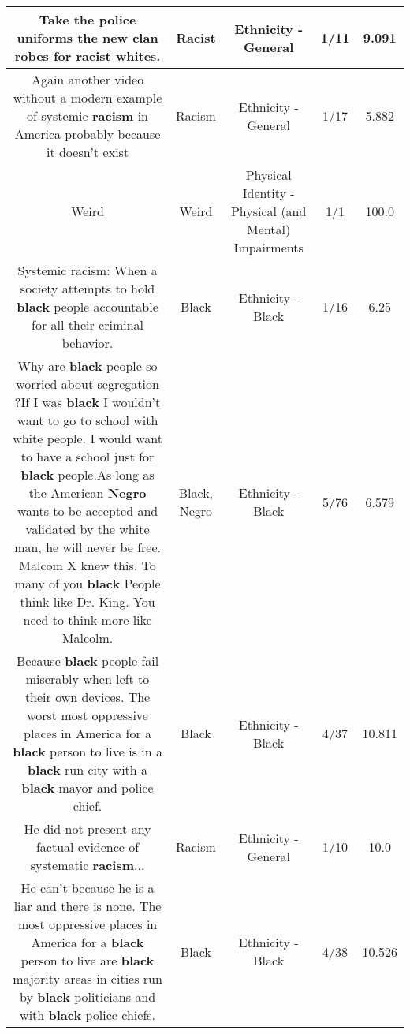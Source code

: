 \documentclass[11pt]{article}
\newlength\mylength
\begin{document}
\begin{center}
\begin{longtable}{|C{.65\mylength}|C{.30\mylength}|C{.12\mylength}|C{.12\mylength}|C{.12\mylength}|}
  \small Take the police uniforms the new clan robes for \textbf{racist} whites.\normalsize   & Racist & Ethnicity - General & 1/11 & 9.091 \\  \hline
  \small Again another video without a modern example of systemic \textbf{racism} in America probably because it doesn't exist\normalsize   & Racism & Ethnicity - General & 1/17 & 5.882 \\  \hline
  \small Weird\normalsize   & Weird & Physical Identity - Physical (and Mental) Impairments & 1/1 & 100.0 \\  \hline
  \small Systemic racism: When a society attempts to hold \textbf{black} people accountable for all their criminal behavior.\normalsize   & Black & Ethnicity - Black & 1/16 & 6.25 \\  \hline
  \small Why are \textbf{black} people so worried about segregation ?If I was \textbf{black} I wouldn't want to go to school with white people. I would want to have a school just for \textbf{black} people.As long as the American \textbf{Negro} wants to be accepted and validated by the white man, he will never be free. Malcom X knew this. To many of you \textbf{black} People think like Dr. King. You need to think more like Malcolm.\normalsize   & Black, Negro & Ethnicity - Black & 5/76 & 6.579 \\  \hline
  \small Because \textbf{black} people fail miserably when left to their own devices. The worst most oppressive places in America for a \textbf{black} person to live is in a \textbf{black} run city with a \textbf{black} mayor and police chief.\normalsize   & Black & Ethnicity - Black & 4/37 & 10.811 \\  \hline
  \small He did not present any factual evidence of systematic \textbf{racism}...\normalsize   & Racism & Ethnicity - General & 1/10 & 10.0 \\  \hline
  \small He can't because he is a liar and there is none. The most oppressive places in America for a \textbf{black} person to live are \textbf{black} majority areas in cities run by \textbf{black} politicians and with \textbf{black} police chiefs.\normalsize   & Black & Ethnicity - Black & 4/38 & 10.526 \\  \hline

\end{longtable}
\end{center}
\end{document}
